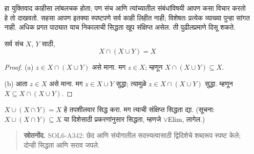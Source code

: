 \begin{explain}
हा युक्तिवाद काहीसा लांबलचक होता; पण संच आणि
त्यांच्यातील संबंधांविषयी आपण कसा विचार करतो हे
तो दाखवतो. सहसा आपण इतक्या स्पष्टपणे सर्व काही
लिहीत नाही; विशेषतः प्रत्येक व्याख्या पुन्हा सांगत
नाही. अधिक प्रगत पाठ्यात याच निकालाची सिद्धता
खूप संक्षिप्त असेल. ती पुढीलप्रमाणे दिसू शकते.
\end{explain}

\begin{prop}[शोषण]
सर्व संच $X$, $Y$ साठी,
\[
X \cap (X \cup Y) = X
\]
\end{prop}

\begin{proof}
(a) $z \in X \cap (X \cup Y)$ असे माना. मग $z \in X$;
म्हणून $X \cap (X
  \cup Y) \subseteq X$.

(b) आता $z \in X$ असे माना. मग $z \in X \cup Y$ सुद्धा;
त्यामुळे $z \in X \cap (X \cup Y)$ सुद्धा. म्हणून
$X \subseteq X \cap (X \cup
  Y)$.
\end{proof}

\begin{prob}
$X \cup (X \cap Y) = X$ हे तपशीलवार सिद्ध करा.
मग त्याची संक्षिप्त सिद्धता द्या. (सूचना:
$X \cup (X \cap Y) \subseteq X$ या दिशेसाठी
प्रकरणांनुसार सिद्धता, म्हणजे $\lor$Elim, लागेल.)
\end{prob}



\begin{quote}\small\textbf{स्रोतनोंद.} SOL6-A342: छेद आणि संयोगातील सदस्यत्वासाठी द्विदिशेचे शब्दरूप स्पष्ट केले; दोन्ही सिद्धता आणि सराव जपले.\end{quote}

